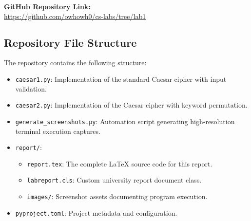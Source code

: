 \documentclass{labreport}
\begin{document}
\begin{center}
\textbf{GitHub Repository Link:}\\
\url{https://github.com/owhowh0/cs-labs/tree/lab1}
\end{center}

\subsection{Repository File Structure}
The repository contains the following structure:
\begin{itemize}
    \item \texttt{caesar1.py}: Implementation of the standard Caesar cipher with input validation.
    \item \texttt{caesar2.py}: Implementation of the Caesar cipher with keyword permutation.
    \item \texttt{generate\_screenshots.py}: Automation script generating high-resolution terminal execution captures.
    \item \texttt{report/}:
    \begin{itemize}
        \item \texttt{report.tex}: The complete \LaTeX{} source code for this report.
        \item \texttt{labreport.cls}: Custom university report document class.
        \item \texttt{images/}: Screenshot assets documenting program execution.
    \end{itemize}
    \item \texttt{pyproject.toml}: Project metadata and configuration.
\end{itemize}
\end{document}
